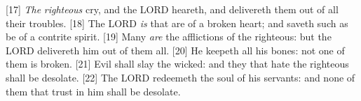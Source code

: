 [17] \textcolor[cmyk]{0.99998,1,0,0}{\emph{The} \emph{righteous} cry, and the LORD heareth, and delivereth them out of all their troubles.}
[18] \textcolor[cmyk]{0.99998,1,0,0}{The LORD \emph{is}  that are of a broken heart; and saveth such as be of a contrite spirit.}
[19] \textcolor[cmyk]{0.99998,1,0,0}{Many \emph{are} the afflictions of the righteous: but the LORD delivereth him out of them all.}
[20] \textcolor[cmyk]{0.99998,1,0,0}{He keepeth all his bones: not one of them is broken.}
[21] \textcolor[cmyk]{0.99998,1,0,0}{Evil shall slay the wicked: and they that hate the righteous shall be desolate.}
[22] \textcolor[cmyk]{0.99998,1,0,0}{The LORD redeemeth the soul of his servants: and none of them that trust in him shall be desolate.}